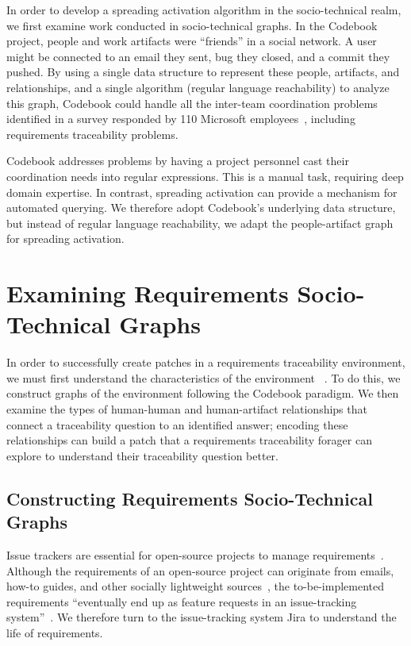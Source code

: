 \documentclass[conference]{IEEEtran}
\begin{document}
In order to develop a spreading activation algorithm in the socio-technical realm, we first examine work conducted in socio-technical graphs. In the Codebook~\cite{codebook} project, people and work artifacts were ``friends'' in a social network. A user might be connected to an email they sent, bug they closed, and a commit they pushed. By using a single data structure to represent these people, artifacts, and relationships, and a single algorithm (regular language reachability) to analyze this graph, Codebook could handle all the inter-team coordination problems identified in a survey responded by 110 Microsoft employees~\cite{codebook10}, including requirements traceability problems. 

Codebook addresses problems by having a project personnel cast their coordination needs into regular expressions. This is a manual task, requiring deep domain expertise. In contrast, spreading activation can provide a mechanism for automated querying. We therefore adopt Codebook's underlying data structure, but instead of regular language reachability, we adapt the people-artifact graph for spreading activation.

\section{Examining Requirements Socio-Technical Graphs}
In order to successfully create patches in a requirements traceability environment, we must first understand the characteristics of the environment ~\cite{niu2016gray,niu2016clustering}. To do this, we construct graphs of the environment following the Codebook paradigm. We then examine the types of human-human and human-artifact relationships that connect a traceability question to an identified answer; encoding these relationships can build a patch that a requirements traceability forager can explore to understand their traceability question better.

\subsection{Constructing Requirements Socio-Technical Graphs}
Issue trackers are essential for open-source projects to manage requirements~\cite{ICSE5,ICSE25,ICSE33,ICSE40,ICSE60,niu2014traceability}. Although the requirements of an open-source project can originate from emails, how-to guides, and other socially lightweight sources~\cite{ICSE62}, the to-be-implemented requirements ``eventually end up as feature requests in an issue-tracking system''~\cite{ICSE33}. We therefore turn to the issue-tracking system Jira to understand the life of requirements.
\end{document}
